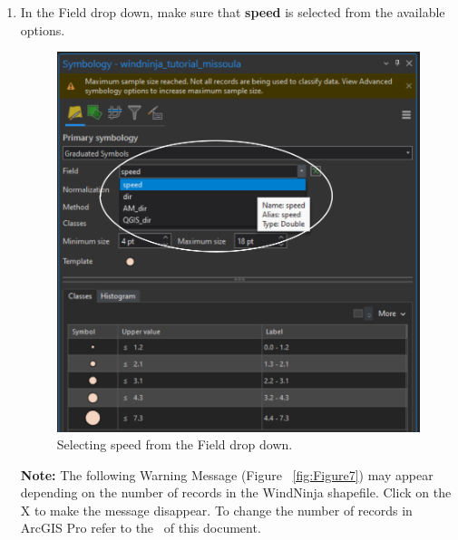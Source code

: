 \documentclass[12pt]{article}
\begin{document}
\begin{enumerate}
\item In the Field drop down, make sure that \textbf{speed} is selected from the available options. 

\begin{figure}[H]
	\centering
	\includegraphics[scale=0.28]{arc_6.png}
	\caption{Selecting speed from the Field drop down.}
\label{fig:Figure6}
\end{figure}

\textbf{Note: }The following Warning Message (Figure ~\ref{fig:Figure7}) may appear depending on the number of records in the WindNinja shapefile. Click on the X to make the message disappear. To change the number of records in ArcGIS Pro refer to the~ of this document.


\end{enumerate}
\end{document}
